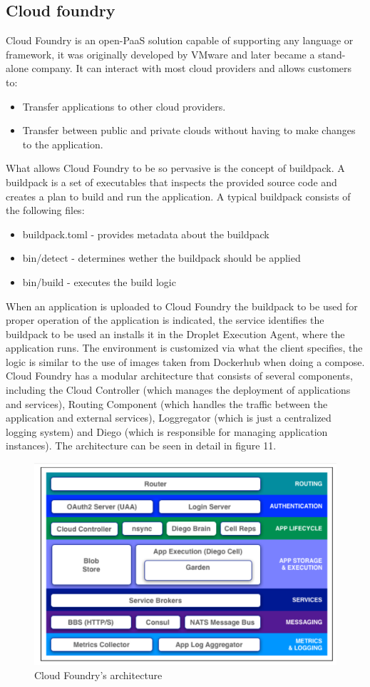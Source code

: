 \subsection{Cloud foundry}
Cloud Foundry is an open-PaaS solution capable of supporting any language or framework, it was originally developed by VMware and later became a stand-alone company. It can interact with most cloud providers and allows customers to:
\begin{itemize}
    \item Transfer applications to other cloud providers.
    \item Transfer between public and private clouds without having to make changes to the application.
\end{itemize}
What allows Cloud Foundry to be so pervasive is the concept of buildpack. \n
A buildpack is a set of executables that inspects the provided source code and creates a plan to build and run the application. A typical buildpack consists of the following files:
\begin{itemize}
    \item \textsf{buildpack.toml} - provides metadata about the buildpack
    \item \textsf{bin/detect} - determines wether the buildpack should be applied
    \item \textsf{bin/build} - executes the build logic
\end{itemize}
When an application is uploaded to Cloud Foundry the buildpack to be used for proper operation of the application is indicated, the service identifies the buildpack to be used an installs it in the Droplet Execution Agent, where the application runs. \n
The environment is customized via what the client specifies, the logic is similar to the use of images taken from Dockerhub when doing a compose. \n
Cloud Foundry has a modular architecture that consists of several components, including the Cloud Controller (which manages the deployment of applications and services), Routing Component (which handles the traffic between the application and external services), Loggregator (which is just a centralized logging system) and Diego (which is responsible for managing application instances). The architecture can be seen in detail in figure 11.
\begin{figure}
    \centering
    \includegraphics[scale=0.5]{./Images/Cloud_Foundry.png}
    \caption{Cloud Foundry's architecture}
\end{figure}

